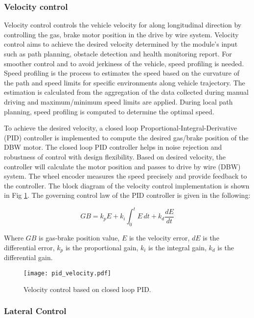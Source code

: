\documentclass[10 pt,a4paper,conference]{IEEEtran}
\begin{document}
\subsubsection{Velocity control}\label{velocity-control}

Velocity control controls the vehicle velocity for along longitudinal
direction by controlling the gas, brake motor position in the drive by
wire system. Velocity control aims to achieve the desired velocity
determined by the module's input such as path planning, obstacle
detection and health monitoring report. For smoother control and to
avoid jerkiness of the vehicle, speed profiling is needed. Speed
profiling is the process to estimates the speed based on the curvature
of the path and speed limits for specific environments along vehicle
trajectory. The estimation is calculated from the aggregation of the
data collected during manual driving and maximum/minimum speed limits
are applied. During local path planning, speed profiling is computed to
determine the optimal speed.

To achieve the desired velocity, a closed loop
Proportional-Integral-Derivative (PID) controller is implemented to
compute the desired gas/brake position of the DBW motor. The closed loop
PID controller helps in noise rejection and robustness of control with
design flexibility. Based on desired velocity, the controller will
calculate the motor position and passes to drive by wire (DBW) system.
The wheel encoder measures the speed precisely and provide feedback to
the controller. The block diagram of the velocity control implementation
is shown in Fig \ref{fig_vel_control}. The governing control law of the
PID controller is given in the following:

\begin{equation}
\label{eqn_pid}
GB = k_p{E} + k_{i}\int_{0}^{t}{E}\,{dt} + k_{d}\frac{dE}{dt}
\end{equation}

Where \(GB\) is gas-brake position value, \(E\) is the velocity error,
\(dE\) is the differential error, \(k_p\) is the proportional gain,
\(k_i\) is the integral gain, \(k_d\) is the differential gain.

\begin{figure}[!t]
\centering
\texttt{[image: pid\_velocity.pdf]}
\caption{Velocity control based on closed loop PID.}
\label{fig_vel_control}
\end{figure}

\subsubsection{Lateral Control}\label{lateral-control}
\end{document}

